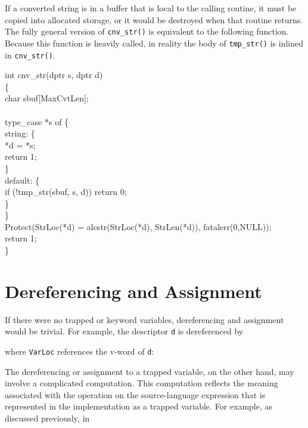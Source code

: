 If a converted string is in a buffer that is local to the calling
routine, it must be copied into allocated storage, or it would be
destroyed when that routine returns. The fully general version of
\texttt{cnv\_str()} is equivalent to the following function. Because
this function is heavily called, in reality the body of
\texttt{tmp\_str()} is inlined in \texttt{cnv\_str()}.

\begin{iconcode}
int cnv\_str(dptr s, dptr d)\\
\>\{\\
\>char sbuf[MaxCvtLen];\\
\\
\>type\_case *s of \{\\
\>\>string: \{\\
\>\>\>*d = *s;\\
\>\>\>return 1;\\
\>\>\>\}\\
\>\>default: \{\\
\>\>\>if (!tmp\_str(sbuf, s, d)) return 0;\\
\>\>\>\}\\
\>\>\}\\
\>Protect(StrLoc(*d) = alcstr(StrLoc(*d), StrLen(*d)), fatalerr(0,NULL));\\
\>return 1;\\
\>\}
\end{iconcode}


\section{Dereferencing and Assignment}

If there were no trapped or keyword variables, dereferencing and assignment would
be trivial. For example, the descriptor \texttt{d} is dereferenced by


\noindent where \texttt{VarLoc} references the v-word of \texttt{d}:


The dereferencing or assignment to a trapped variable, on the other
hand, may involve a complicated computation. This computation reflects
the meaning associated with the operation on the source-language
expression that is represented in the implementation as a trapped
variable. For example, as discussed previously, in

